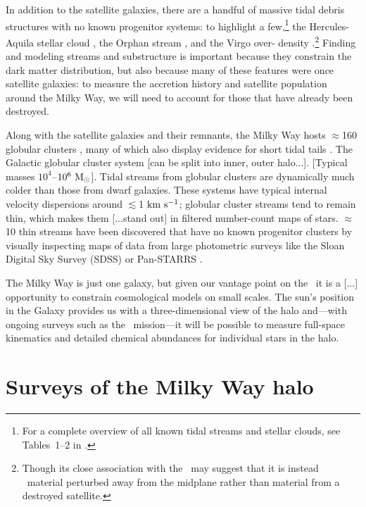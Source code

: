 In addition to the satellite galaxies, there are a handful of massive tidal
debris structures with no known progenitor systems: to highlight a
few,\footnote{For a complete overview of all known tidal streams and stellar
clouds, see Tables~1--2 in \cite{grillmair16}.} the Hercules-Aquila stellar
cloud \citep{todo}, the Orphan stream \citep{grillmair06b}, and the Virgo over-
density \citep{todo}.\footnote{Though its close association with the \mwdisk\
may suggest that it is instead \mwdisk\ material perturbed away from the
midplane rather than material from a destroyed satellite.} Finding and modeling
streams and substructure is important because they constrain the dark matter
distribution, but also because many of these features were once satellite
galaxies: to measure the accretion history and satellite population around the
Milky Way, we will need to account for those that have already been destroyed.

Along with the satellite galaxies and their remnants, the Milky Way hosts
$\approx$160 globular clusters \citep{harris10}, many of which also display
evidence for short tidal tails \citep{grillmair95, leon00}. The Galactic
globular cluster system [can be split into inner, outer halo...]. [Typical
masses $10^4$--$10^6~\mathrm{M}_\odot$]. Tidal streams from globular clusters are
dynamically much colder than those from dwarf galaxies. These systems have
typical internal velocity dispersions around $\lesssim$1$~\mathrm{km}~\mathrm{s}^{-1}$; globular
cluster streams tend to remain thin, which makes them [...stand out] in filtered
number-count maps of stars. $\approx$10 thin streams have been discovered that
have no known progenitor clusters by visually inspecting maps of data from large
photometric surveys like the Sloan Digital Sky Survey (SDSS) or Pan-STARRS
\citep[e.g.,][]{grillmair06a, bonaca12, bernard14}.

The Milky Way is just one galaxy, but given our vantage point on the \mwhalo\ it
is a [...] opportunity to constrain cosmological models on small scales. The
sun's position in the Galaxy provides us with a three-dimensional view of the
halo and---with ongoing surveys such as the \gaia\ mission---it will be possible
to measure full-space kinematics and detailed chemical abundances for individual
stars in the halo.

\section{Surveys of the Milky Way halo} \label{sec:mw-surveys}

